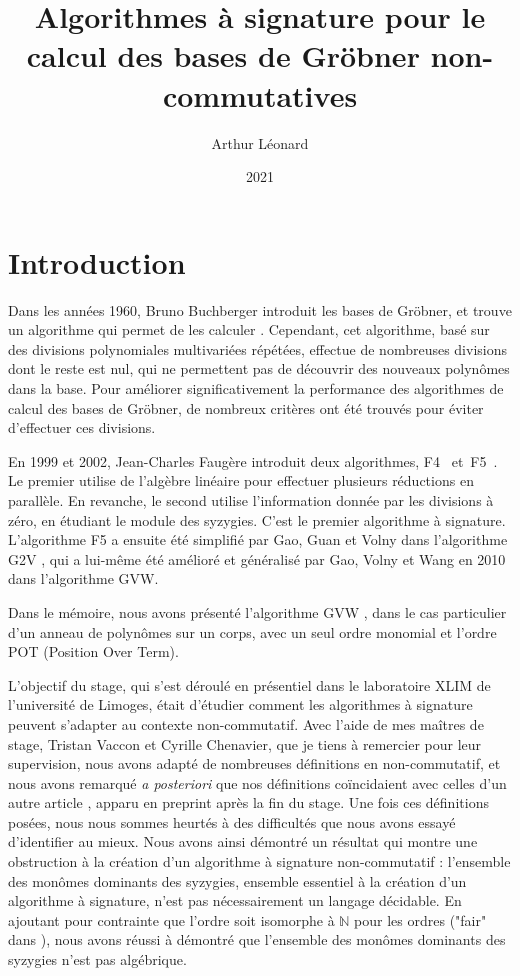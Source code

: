 \documentclass{article}
\title{Algorithmes à signature pour le calcul des bases de Gröbner non-commutatives}
\author{Arthur Léonard}
\date{2021}
\newcommand{\N}{\mathbb{N}}
\begin{document}
\maketitle

\section*{Introduction}
Dans les années 1960, Bruno Buchberger introduit les bases de Gröbner, et trouve un algorithme qui permet de les calculer \cite{buchberger}. Cependant, cet algorithme, basé sur des divisions polynomiales multivariées répétées, effectue de nombreuses divisions dont le reste est nul, qui ne permettent pas de découvrir des nouveaux polynômes dans la base. Pour améliorer significativement la performance des algorithmes de calcul des bases de Gröbner, de nombreux critères ont été trouvés pour éviter d'effectuer ces divisions.

En 1999 et 2002, Jean-Charles Faugère introduit deux algorithmes, F4~\cite{f4} et~F5~\cite{f5}. Le premier utilise de l'algèbre linéaire pour effectuer plusieurs réductions en parallèle. En revanche, le second utilise l'information donnée par les divisions à zéro, en étudiant le module des syzygies. C'est le premier algorithme à signature. L'algorithme F5 a ensuite été simplifié par Gao, Guan et Volny dans l'algorithme G2V \cite{g2v}, qui a lui-même été amélioré et généralisé par Gao, Volny et Wang en 2010 dans l'algorithme GVW.

Dans le mémoire, nous avons présenté l'algorithme GVW \cite{gvw}, dans le cas particulier d'un anneau de polynômes sur un corps, avec un seul ordre monomial et l'ordre POT (Position Over Term).

L'objectif du stage, qui s'est déroulé en présentiel dans le laboratoire XLIM de l'université de Limoges, était d'étudier comment les algorithmes à signature peuvent s'adapter au contexte non-commutatif. Avec l'aide de mes maîtres de stage, Tristan Vaccon et Cyrille Chenavier, que je tiens à remercier pour leur supervision, nous avons adapté de nombreuses définitions en non-commutatif, et nous avons remarqué \textit{a posteriori} que nos définitions coïncidaient avec celles d'un autre article \cite{noncom}, apparu en preprint après la fin du stage. Une fois ces définitions posées, nous nous sommes heurtés à des difficultés que nous avons essayé d'identifier au mieux. Nous avons ainsi démontré un résultat qui montre une obstruction à la création d'un algorithme à signature non-commutatif : l'ensemble des monômes dominants des syzygies, ensemble essentiel à la création d'un algorithme à signature, n'est pas nécessairement un langage décidable. En ajoutant pour contrainte que l'ordre soit isomorphe à $\N$ pour les ordres ("fair" dans \cite{noncom}), nous avons réussi à démontré que l'ensemble des monômes dominants des syzygies n'est pas algébrique.
\end{document}
